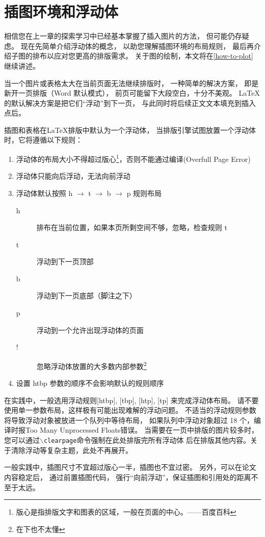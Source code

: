 \section{插图环境和浮动体}

相信您在上一章的探索学习中已经基本掌握了插入图片的方法，
但可能仍存疑虑。
现在先简单介绍浮动体的概念，
以助您理解插图环境的布局规则，
最后再介绍子图的排布以应对您更高的排版需求。
关于图的绘制，本文将在\autoref{how-to-plot} 继续讲述。 %

当一个图片或表格太大在当前页面无法继续排版时，
一种简单的解决方案，
即是新开一页排版（Word 默认模式），
前页可能留下大段空白，十分不美观。
\LaTeX 的默认解决方案是把它们“浮动”到下一页，
与此同时将后续正文文本填充到插入点后。

插图和表格在\LaTeX 排版中默认为一个浮动体，
当排版引擎试图放置一个浮动体时，它将遵循以下规则：
\begin{enumerate}
    \item 浮动体的布局大小不得超过版心\footnote{版心是指排版文字和图表的区域，一般在页面的中心。——百度百科}，否则不能通过编译(Overfull Page Error)
    \item 浮动体只能向后浮动，无法向前浮动
    \item 浮动体默认按照 h $\to$ t $\to$ b $\to$ p 规则布局
    \begin{description}
        \item[h] 排布在当前位置，如果本页所剩空间不够，忽略，检查规则 t
        \item[t] 浮动到下一页顶部
        \item[b] 浮动到下一页底部（脚注之下）
        \item[p] 浮动到一个允许出现浮动体的页面
        \item[!] 忽略浮动体放置的大多数内部参数\footnote{在下也不太懂}
    \end{description}
    \item 设置 htbp 参数的顺序不会影响默认的规则顺序
\end{enumerate}
在实践中，一般选用浮动规则[htbp], [tbp], [htp], [tp] 来完成浮动体布局。
请不要使用单一参数布局，这样极有可能出现难解的浮动问题。
不适当的浮动规则参数将导致浮动对象被放进一个队列中等待布局，
如果队列中浮动对象超过 18 个，编译时报Too Many Unprocessed Floats错误。
当需要在一页中排版的图片较多时，
您可以通过\texttt{$\backslash$clearpage}命令强制在此处排版完所有浮动体
后在排版其他内容。关于清除浮动等复杂主题，此处不再展开。

一般实践中，插图尺寸不宜超过版心一半，插图也不宜过密。
另外，可以在论文内容稳定后，
通过前置插图代码，
强行“向前浮动”，保证插图和引用处的距离不至于太远。

